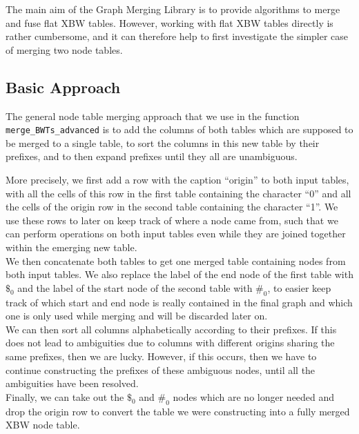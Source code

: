 \documentclass[a4paper,12pt,twoside,BCOR=10mm]{scrbook}
\begin{document}
The main aim of the Graph Merging Library is to provide algorithms
to merge and fuse flat XBW tables.
However, working with flat XBW tables directly is rather cumbersome,
and it can therefore help to first investigate the simpler case
of merging two node tables.

\subsection{Basic Approach}

The general node table merging approach that we use
in the function \texttt{merge\_BWTs\_advanced}
is to add the columns of both tables which are supposed to be merged to a single table,
to sort the columns in this new table by their prefixes,
and to then expand prefixes until they all are unambiguous.

More precisely, we first add a row with the caption “origin” to both input tables,
with all the cells of this row in the first table containing the character “0” and
all the cells of the origin row in the second table containing the character “1”.
We use these rows to later on keep track of where a node came from,
such that we can perform operations on both input tables even while
they are joined together within the emerging new table. \\
We then concatenate both tables to get one merged table containing
nodes from both input tables.
We also replace the label of the end node of the first table with $\$_0$ and
the label of the start node of the second table with $\#_0$, to easier keep track
of which start and end node is really contained in the final graph
and which one is only used while merging and will be discarded later on. \\
We can then sort all columns alphabetically according to their prefixes.
If this does not lead to ambiguities due to columns with different origins
sharing the same prefixes, then we are lucky. However, if this occurs,
then we have to continue constructing the prefixes of these ambiguous nodes,
until all the ambiguities have been resolved. \\
Finally, we can take out the $\$_0$ and $\#_0$ nodes which are no longer needed
and drop the origin row to convert the table we were constructing into
a fully merged XBW node table.


%
%
\end{document}
